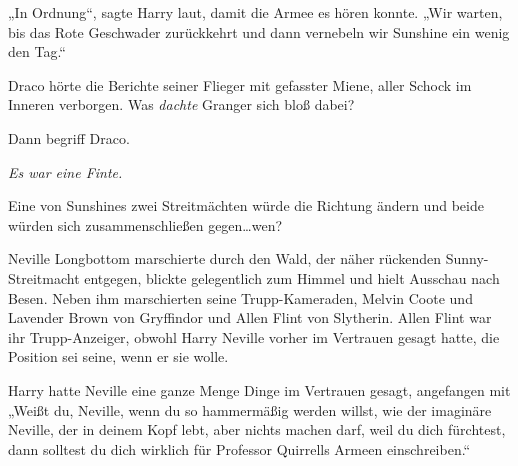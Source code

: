 „In Ordnung“, sagte Harry laut, damit die Armee es hören konnte. „Wir warten, bis das Rote Geschwader zurückkehrt und dann vernebeln wir Sunshine ein wenig den Tag.“

\later

Draco hörte die Berichte seiner Flieger mit gefasster Miene, aller Schock im Inneren verborgen. Was \emph{dachte} Granger sich bloß dabei?

Dann begriff Draco.

\emph{Es war eine Finte.}

Eine von Sunshines zwei Streitmächten würde die Richtung ändern und beide würden sich zusammenschließen gegen…wen?

\later

Neville Longbottom marschierte durch den Wald, der näher rückenden Sunny-Streitmacht entgegen, blickte gelegentlich zum Himmel und hielt Ausschau nach Besen. Neben ihm marschierten seine Trupp-Kameraden, Melvin Coote und Lavender Brown von Gryffindor und Allen Flint von Slytherin. Allen Flint war ihr Trupp-Anzeiger, obwohl Harry Neville vorher im Vertrauen gesagt hatte, die Position sei seine, wenn er sie wolle.

Harry hatte Neville eine ganze Menge Dinge im Vertrauen gesagt, angefangen mit „Weißt du, Neville, wenn du so hammermäßig werden willst, wie der imaginäre Neville, der in deinem Kopf lebt, aber nichts machen darf, weil du dich fürchtest, dann solltest du dich wirklich für Professor Quirrells Armeen einschreiben.“

